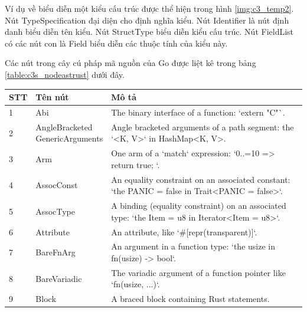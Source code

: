 Ví dụ về biểu diễn một kiểu cấu trúc được thể hiện trong hình \ref{img:c3_temp2}.
Nút TypeSpecification đại diện cho định nghĩa kiểu.
Nút Identifier là nút định danh biểu diễn tên kiểu.
Nút StructType biểu diễn kiểu cấu trúc.
Nút FieldList có các nút con là Field biểu diễn các thuộc tính của kiểu này.

Các nút trong cây cú pháp mã nguồn của Go được liệt kê trong bảng \ref{table:c3s_nodeastrust} dưới đây.

\footnotesize
\begin{longtable}{| p{} | p{} | p{} |}
\hline
\textbf{STT} & \textbf{Tên nút} & \textbf{Mô tả} \\ \hline
1     & Abi                            & The binary interface of a function: `extern "C"`.                                                              \\ \hline
2     & \makecell{AngleBracketed \\ GenericArguments} & Angle bracketed arguments of a path segment: the `<K, V>` in HashMap<K, V>.                                    \\ \hline
3     & Arm                            & One arm of a `match` expression: `0..=10 => { return true; }`.                                                 \\ \hline
4     & AssocConst                     & An equality constraint on an associated constant: `the PANIC = false in Trait<PANIC = false>`.                 \\ \hline
5     & AssocType                      & A binding (equality constraint) on an associated type: `the Item = u8 in Iterator<Item = u8>`.                 \\ \hline
6     & Attribute                      & An attribute, like `\#[repr(transparent)]`.                                                                     \\ \hline
7     & BareFnArg                      & An argument in a function type: `the usize in fn(usize) -> bool`.                                              \\ \hline
8     & BareVariadic                   & The variadic argument of a function pointer like `fn(usize, ...)`.                                             \\ \hline
9     & Block                          & A braced block containing Rust statements.                                                                     \\ \hline

\end{longtable}

